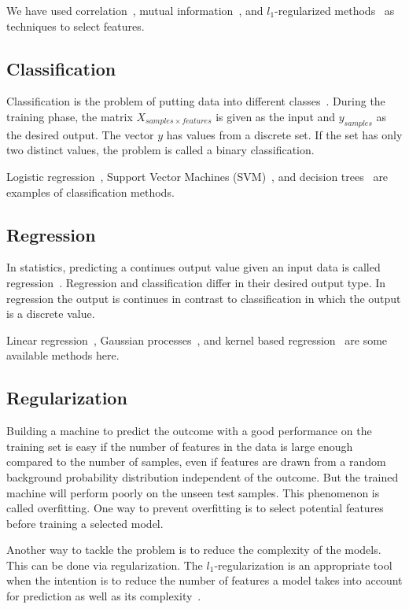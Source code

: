 We have used correlation~\cite{correlation}, mutual information~\cite{mutual-information}, and $l_1$-regularized methods~\cite{l1-regularized} as techniques to select features.

\subsection{Classification}
Classification is the problem of putting data into different classes~\cite[Ch. 1]{statistical-learning}. During the training phase, the matrix $X_{samples \times features}$ is given as the input and $y_{samples}$ as the desired output. The vector $y$ has values from a discrete set. If the set has only two distinct values, the problem is called a binary classification.

Logistic regression~\cite{logistic-regression1,logistic-regression2}, Support Vector Machines (SVM)~\cite{svm1,svm2}, and decision trees~\cite[Ch. 9]{statistical-learning} are examples of classification methods.

\subsection{Regression}
In statistics, predicting a continues output value given an input data is called regression~\cite[Ch. 1]{statistical-learning}. Regression and classification differ in their desired output type. In regression the output is continues in contrast to classification in which the output is a discrete value.

Linear regression~\cite[Ch. 3]{statistical-learning}, Gaussian processes~\cite{gaussian-processes}, and kernel based regression~\cite[Ch. 9]{learning-with-kernels} are some available methods here.

\subsection{Regularization}
Building a machine to predict the outcome with a good performance on the training set is easy if the number of features in the data is large enough compared to the number of samples, even if features are drawn from a random background probability distribution independent of the outcome. But the trained machine will perform poorly on the unseen test samples. This phenomenon is called overfitting. One way to prevent overfitting is to select potential features before training a selected model.

Another way to tackle the problem is to reduce the complexity of the models. This can be done via regularization. The $l_1$-regularization is an appropriate tool when the intention is to reduce the number of features a model takes into account for prediction as well as its complexity~\cite{l1-regularized}.

